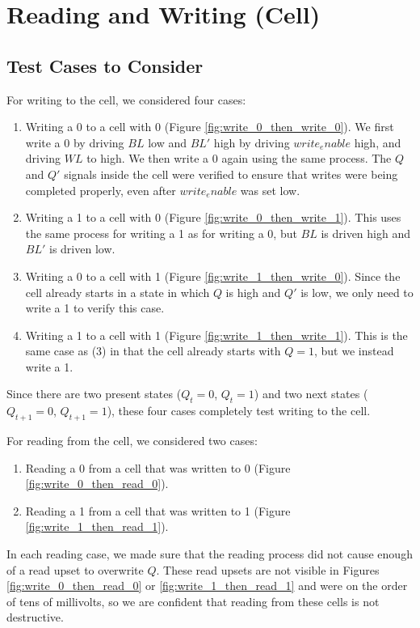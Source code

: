 \documentclass[12pt]{report}
\begin{document}
\section*{Reading and Writing (Cell)}
\subsection*{Test Cases to Consider}
For writing to the cell, we considered four cases:
\begin{enumerate}
\item Writing a 0 to a cell with 0 (Figure \ref{fig:write_0_then_write_0}). We first write a 0 by driving $BL$ low and $BL'$ high by driving $write_enable$ high, and driving $WL$ to high. We then write a 0 again using the same process. The $Q$ and $Q'$ signals inside the cell were verified to ensure that writes were being completed properly, even after $write_enable$ was set low.
\item Writing a 1 to a cell with 0 (Figure \ref{fig:write_0_then_write_1}). This uses the same process for writing a 1 as for writing a 0, but $BL$ is driven high and $BL'$ is driven low.
\item Writing a 0 to a cell with 1 (Figure \ref{fig:write_1_then_write_0}). Since the cell already starts in a state in which $Q$ is high and $Q'$ is low, we only need to write a 1 to verify this case.
\item Writing a 1 to a cell with 1 (Figure \ref{fig:write_1_then_write_1}). This is the same case as (3) in that the cell already starts with $Q = 1$, but we instead write a 1.
\end{enumerate}

Since there are two present states ($Q_t = 0$, $Q_t = 1$) and two next states ($Q_{t+1} = 0$, $Q_{t+1} = 1$), these four cases completely test writing to the cell.

For reading from the cell, we considered two cases:
\begin{enumerate}
\item Reading a 0 from a cell that was written to 0 (Figure \ref{fig:write_0_then_read_0}).
\item Reading a 1 from a cell that was written to 1 (Figure \ref{fig:write_1_then_read_1}).
\end{enumerate}

In each reading case, we made sure that the reading process did not cause enough of a read upset to overwrite $Q$. These read upsets are not visible in Figures \ref{fig:write_0_then_read_0} or \ref{fig:write_1_then_read_1} and were on the order of tens of millivolts, so we are confident that reading from these cells is not destructive.
\end{document}
